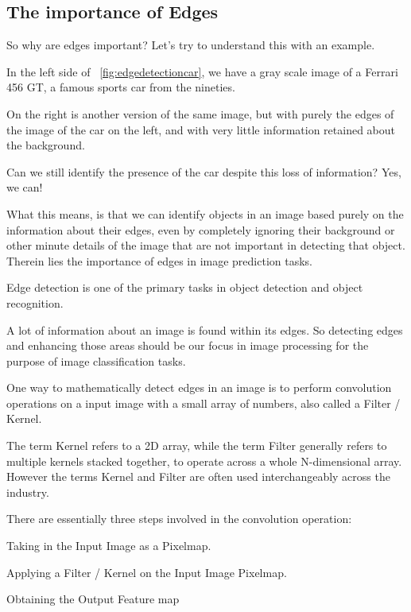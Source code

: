 	\subsection{The importance of Edges}
	\begin{bulletedlist}
		\item So why are edges important?  Let's try to understand this with an example.
		\item In the left side of \figurename~\ref{fig:edgedetectioncar}, we have a gray scale image of a Ferrari 456 GT, a famous sports car from the nineties.
		\item On the right is another version of the same image, but with purely the edges of the image of the car on the left, and with very little information retained about the background.
		\item Can we still identify the presence of the car despite this loss of information?  Yes, we can!
		\item What this means, is that we can identify objects in an image based purely on the information about their edges, even by completely ignoring their background or other minute details of the image that are not important in detecting that object.
Therein lies the importance of edges in image prediction tasks.
		\item Edge detection is one of the primary tasks in object detection and object recognition.
		\item A lot of information about an image is found within its edges. So detecting edges and enhancing those areas should be our focus in image processing for the purpose of image classification tasks.
		\item One way to mathematically detect edges in an image is to perform convolution operations on a input image with a small array of numbers, also called a Filter / Kernel.
		\item The term Kernel refers to a 2D array, while the term Filter generally refers to multiple kernels stacked
together, to operate across a whole N-dimensional array. However the terms Kernel and Filter are often
used interchangeably across the industry.
		\item There are essentially three steps involved in the convolution operation:
		\begin{numberedlist}
			\item Taking in the Input Image as a Pixelmap.
			\item Applying a Filter / Kernel on the Input Image Pixelmap.
			\item Obtaining the Output Feature map
		\end{numberedlist}
	\end{bulletedlist}

